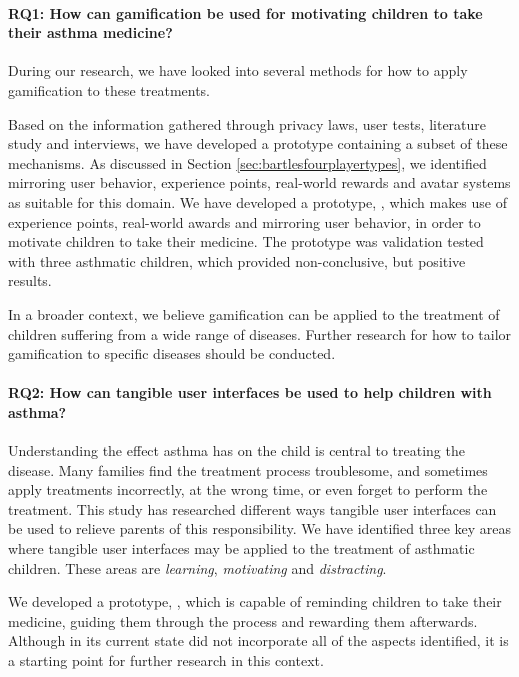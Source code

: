 \paragraph{RQ1: How can gamification be used for motivating children to take their asthma medicine?}

During our research, we have looked into several methods for how to apply gamification to these treatments. 

Based on the information gathered through privacy laws, user tests, literature study and interviews, we have developed a prototype containing a subset of these mechanisms. As discussed in Section \ref{sec:bartlesfourplayertypes}, we identified mirroring user behavior, experience points, real-world rewards and avatar systems as suitable for this domain. We have developed a prototype, \app{}, which makes use of experience points, real-world awards and mirroring user behavior, in order to motivate children to take their medicine. The prototype was validation tested with three asthmatic children, which provided non-conclusive, but positive results.

In a broader context, we believe gamification can be applied to the treatment of children suffering from a wide range of diseases. Further research for how to tailor gamification to specific diseases should be conducted.  

\paragraph{RQ2: How can tangible user interfaces be used to help children with asthma?}

Understanding the effect asthma has on the child is central to treating the disease. Many families find the treatment process troublesome, and sometimes apply treatments incorrectly, at the wrong time, or even forget to perform the treatment. This study has researched different ways tangible user interfaces can be used to relieve parents of this responsibility. 
We have identified three key areas where tangible user interfaces may be applied to the treatment of asthmatic children. These areas are \emph{learning}, \emph{motivating} and \emph{distracting}. 

We developed a prototype, \ab{}, which is capable of reminding children to take their medicine, guiding them through the process and rewarding them afterwards. Although \ab{} in its current state did not incorporate all of the aspects identified, it is a starting point for further research in this context.   

